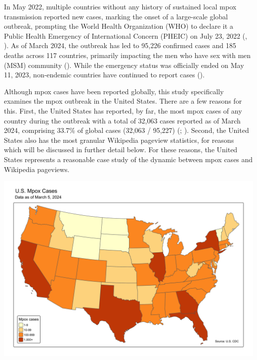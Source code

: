 \documentclass[
  12pt,
]{article}
\begin{document}
In May 2022, multiple countries without any history of sustained local
mpox transmission reported new cases, marking the onset of a large-scale
global outbreak, prompting the World Health Organization (WHO) to
declare it a Public Health Emergency of International Concern (PHEIC) on
July 23, 2022 (,
). As of March 2024, the outbreak has led
to 95,226 confirmed cases and 185 deaths across 117 countries, primarily
impacting the men who have sex with men (MSM) community
().
While the emergency status was officially ended on May 11, 2023,
non-endemic countries have continued to report cases
().

Although mpox cases have been reported globally, this study specifically
examines the mpox outbreak in the United States. There are a few reasons
for this. First, the United States has reported, by far, the most mpox
cases of any country during the outbreak with a total of 32,063 cases
reported as of March 2024, comprising 33.7\% of global cases (32,063 /
95,227) (; ). Second, the United States also has the most granular Wikipedia
pageview statistics, for reasons which will be discussed in further
detail below. For these reasons, the United States represents a
reasonable case study of the dynamic between mpox cases and Wikipedia
pageviews.

\begin{center}
\includegraphics{images/cases-USA-map.png}
\end{center}
\end{document}
